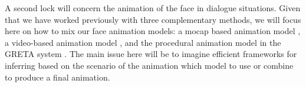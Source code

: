 

A second lock will concern the animation of the face in dialogue situations. Given that we have worked previously with three complementary methods, we will focus here on how to mix our face animation models: a mocap based animation model \cite{DBLP:conf/icassp/DingRAP13,Ding:2014:LAS}, a video-based animation model \cite{Barbulescu2014}, and the procedural animation model in the GRETA system  \cite{greta}. The main issue here will be to imagine efficient frameworks for inferring based on the scenario of the animation which model to use or combine to produce a final animation.

